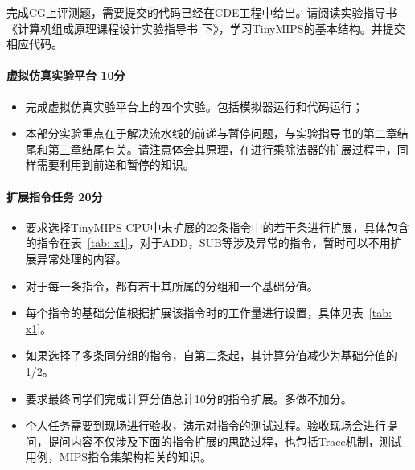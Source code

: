 完成CG上评测题，需要提交的代码已经在CDE工程中给出。请阅读实验指导书《计算机组成原理课程设计实验指导书 下》，学习TinyMIPS的基本结构。并提交相应代码。

\paragraph{虚拟仿真实验平台 10分}

\begin{itemize}
    \item 完成虚拟仿真实验平台上的四个实验。包括模拟器运行和代码运行；
    \item 本部分实验重点在于解决流水线的前递与暂停问题，与实验指导书的第二章结尾和第三章结尾有关。请注意体会其原理，在进行乘除法器的扩展过程中，同样需要利用到前递和暂停的知识。
\end{itemize}

\paragraph{扩展指令任务 20分}

\begin{itemize}
    \item 要求选择TinyMIPS CPU中未扩展的22条指令中的若干条进行扩展，具体包含的指令在表~\ref{tab: x1}，对于ADD，SUB等涉及异常的指令，暂时可以不用扩展异常处理的内容。
    \item 对于每一条指令，都有若干其所属的分组和一个基础分值。
    \item 每个指令的基础分值根据扩展该指令时的工作量进行设置，具体见表~\ref{tab: x1}。
    \item 如果选择了多条同分组的指令，自第二条起，其计算分值减少为基础分值的1/2。
    \item 要求最终同学们完成计算分值总计10分的指令扩展。多做不加分。
    \item 个人任务需要到现场进行验收，演示对指令的测试过程。验收现场会进行提问，提问内容不仅涉及下面的指令扩展的思路过程，也包括Trace机制，测试用例，MIPS指令集架构相关的知识。
\end{itemize}



